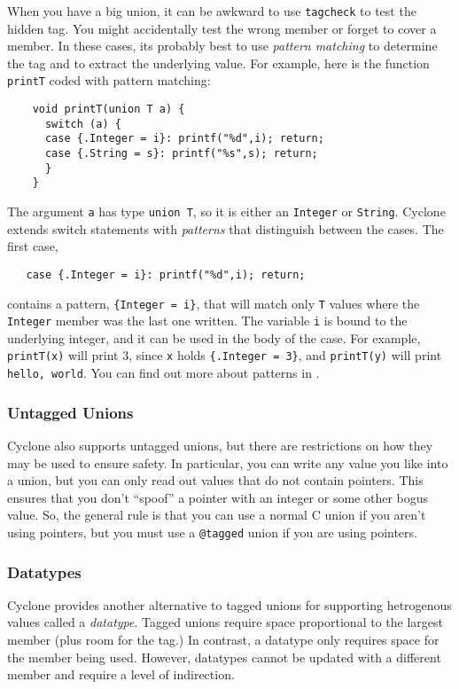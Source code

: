 When you have a big union, it can be awkward to use \texttt{tagcheck}
to test the hidden tag.  You might accidentally test the wrong
member or forget to cover a member.  In these cases, its probably
best to use \emph{pattern matching} to determine the tag and 
to extract the underlying value.  For
example, here is the function \texttt{printT} coded with
pattern matching:
\begin{verbatim}
    void printT(union T a) {
      switch (a) {
      case {.Integer = i}: printf("%d",i); return;
      case {.String = s}: printf("%s",s); return;
      }
    }
\end{verbatim}
The argument \texttt{a} has type \texttt{union T}, so it is either
an \texttt{Integer} or \texttt{String}.  Cyclone
extends switch statements with \emph{patterns} that distinguish
between the cases.  The first case,
\begin{verbatim}
   case {.Integer = i}: printf("%d",i); return;
\end{verbatim}
contains a pattern, \texttt{\{Integer = i\}}, that will match only 
\texttt{T} values where the \texttt{Integer} member was the last
one written.  The variable
\texttt{i} is bound to the underlying integer, and it can be used in
the body of the case.  For example, \texttt{printT(x)} will print 3,
since \texttt{x} holds \texttt{\{.Integer = 3\}}, and
\texttt{printT(y)} will print \texttt{hello, world}.
You can find out more about patterns in
.

\subsubsection*{Untagged Unions}

Cyclone also supports untagged unions, but there are restrictions
on how they may be used to ensure safety.  In particular, you can
write any value you like into a union, but you can only read out
values that do not contain pointers.  This ensures that you don't
``spoof'' a pointer with an integer or some other bogus value.
So, the general rule is that you can use a normal C union if
you aren't using pointers, but you must use a \texttt{@tagged}
union if you are using pointers.  

\subsubsection*{Datatypes}

Cyclone provides another alternative to tagged unions for supporting
hetrogenous values called a \emph{datatype}.  Tagged
unions require space proportional to the largest member (plus room
for the tag.)  In contrast, a datatype only requires space for the
member being used.  However, datatypes cannot be updated with a
different member and require a level of indirection. 


